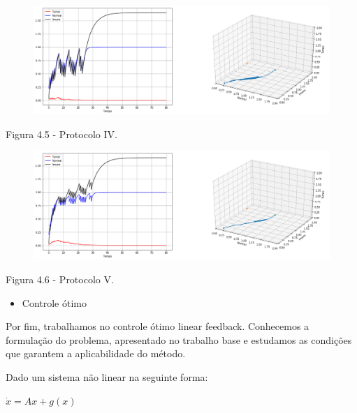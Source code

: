 \documentclass[12pt, a4paper]{article}
\begin{document}
\newpage

\begin{center}
\begin{figure}[!h]
	\centering
    \includegraphics[scale=0.4]{imgs/plot_trat_4.png}

  \end{figure}


Figura 4.5 - Protocolo IV.
\end{center}

\begin{center}
\begin{figure}[!h]
	\centering
    \includegraphics[scale=0.4]{imgs/plot_trat_5.png}

  \end{figure}


Figura 4.6 - Protocolo V.
\end{center}

\begin{itemize}
\item Controle ótimo
\end{itemize}

Por fim, trabalhamos no controle ótimo linear feedback. Conhecemos a formulação do problema, apresentado no trabalho base e estudamos as condições que garantem a aplicabilidade do método.\

Dado um sistema não linear na seguinte forma:

\begin{center}
$\dot x = Ax + g(x)$
\end{center}
\end{document}
